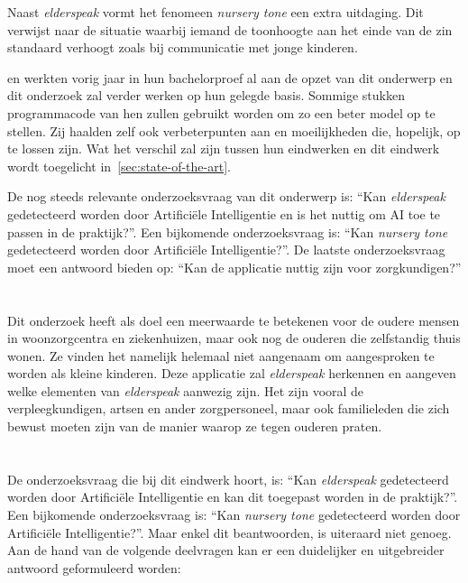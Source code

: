 Naast \textit{elderspeak} vormt het fenomeen \textit{nursery tone} een extra uitdaging. Dit verwijst naar de situatie waarbij iemand de toonhoogte aan het einde van de zin standaard verhoogt zoals bij communicatie met jonge kinderen.

\textcite{Beeckman2021} en \textcite{Standaert2021} werkten vorig jaar in hun bachelorproef al aan de opzet van dit onderwerp en dit onderzoek zal verder werken op hun gelegde basis.
Sommige stukken programmacode van hen zullen gebruikt worden om zo een beter model op te stellen.
Zij haalden zelf ook verbeterpunten aan en moeilijkheden die, hopelijk, op te lossen zijn. Wat het verschil zal zijn tussen hun eindwerken en dit eindwerk wordt toegelicht in~\ref{sec:state-of-the-art}.

De nog steeds relevante onderzoeksvraag van dit onderwerp is: ``Kan \textit{elderspeak} gedetecteerd worden door Artificiële Intelligentie en is het nuttig om AI toe te passen in de praktijk?''. Een bijkomende onderzoeksvraag is: ``Kan \textit{nursery tone} gedetecteerd worden door Artificiële Intelligentie?''. De laatste onderzoeksvraag moet een antwoord bieden op: ``Kan de applicatie nuttig zijn voor zorgkundigen?''

\section{}
\label{sec:probleemstelling}

Dit onderzoek heeft als doel een meerwaarde te betekenen voor de oudere mensen in woonzorgcentra en ziekenhuizen, maar ook nog de ouderen die zelfstandig thuis wonen. Ze vinden het namelijk helemaal niet aangenaam om aangesproken te worden als kleine kinderen. Deze applicatie zal \textit{elderspeak} herkennen en aangeven welke elementen van \textit{elderspeak} aanwezig zijn. Het zijn vooral de verpleegkundigen, artsen en ander zorgpersoneel, maar ook familieleden die zich bewust moeten zijn van de manier waarop ze tegen ouderen praten.

\section{}
\label{sec:onderzoeksvraag}

De onderzoeksvraag die bij dit eindwerk hoort, is: ``Kan \textit{elderspeak} gedetecteerd worden door Artificiële Intelligentie en kan dit toegepast worden in de praktijk?''. Een bijkomende onderzoeksvraag is: ``Kan \textit{nursery tone} gedetecteerd worden door Artificiële Intelligentie?''. Maar enkel dit beantwoorden, is uiteraard niet genoeg.
Aan de hand van de volgende deelvragen kan er een duidelijker en uitgebreider antwoord geformuleerd worden:

